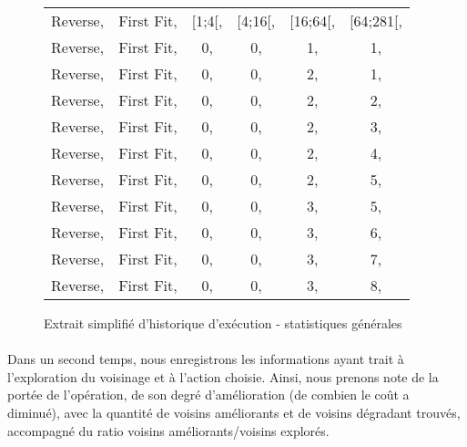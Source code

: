 \documentclass[a4paper,10pt]{report}
\begin{document}
\begin{figure}[h]
  \begin{center}
    \begin{tabular}{cccccc}
      Reverse,&First Fit,&[1;4[,&[4;16[,&[16;64[,&[64;281[,\\
      Reverse,&First Fit,&0,    &0,     &1,      &1,\\
      Reverse,&First Fit,&0,    &0,     &2,      &1,\\
      Reverse,&First Fit,&0,    &0,     &2,      &2,\\
      Reverse,&First Fit,&0,    &0,     &2,      &3,\\
      Reverse,&First Fit,&0,    &0,     &2,      &4,\\
      Reverse,&First Fit,&0,    &0,     &2,      &5,\\
      Reverse,&First Fit,&0,    &0,     &3,      &5,\\
      Reverse,&First Fit,&0,    &0,     &3,      &6,\\
      Reverse,&First Fit,&0,    &0,     &3,      &7,\\
      Reverse,&First Fit,&0,    &0,     &3,      &8,\\
    \end{tabular}
  \end{center}
  \label{a280-sample-interval-simple}
  \caption{Extrait simplifié d'historique d'exécution - statistiques générales}
\end{figure}

\paragraph{}
  Dans un second temps, nous enregistrons les informations ayant trait à l'exploration du voisinage
et à l'action choisie. Ainsi, nous prenons note de la portée de l'opération, de son degré d'amélioration
(de combien le coût a diminué), avec la quantité de voisins améliorants et de voisins dégradant trouvés,
accompagné du ratio voisins améliorants/voisins explorés.
\end{document}

